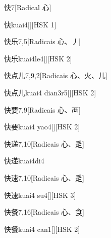 \begin{entry}{快}{7}[Radical ⼼]
  \begin{phonetics}{快}{kuai4}[][HSK 1]
  \end{phonetics}
\end{entry}

\begin{entry}{快乐}{7,5}[Radicais ⼼、⼃]
  \begin{phonetics}{快乐}{kuai4le4}[][HSK 2]
  \end{phonetics}
\end{entry}

\begin{entry}{快点儿}{7,9,2}[Radicais ⼼、⽕、⼉]
  \begin{phonetics}{快点儿}{kuai4 dian3r5}[][HSK 2]
  \end{phonetics}
\end{entry}

\begin{entry}{快要}{7,9}[Radicais ⼼、⾑]
  \begin{phonetics}{快要}{kuai4 yao4}[][HSK 2]
  \end{phonetics}
\end{entry}

\begin{entry}{快递}{7,10}[Radicais ⼼、⾡]
  \begin{phonetics}{快递}{kuai4di4}
  \end{phonetics}
\end{entry}

\begin{entry}{快速}{7,10}[Radicais ⼼、⾡]
  \begin{phonetics}{快速}{kuai4 su4}[][HSK 3]
  \end{phonetics}
\end{entry}

\begin{entry}{快餐}{7,16}[Radicais ⼼、⾷]
  \begin{phonetics}{快餐}{kuai4 can1}[][HSK 2]
  \end{phonetics}
\end{entry}

